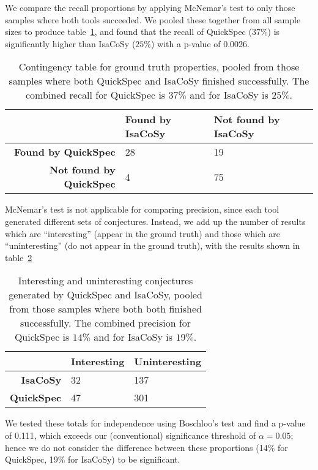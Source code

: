 We compare the recall proportions by applying McNemar's test to only those
samples where both tools succeeded. We pooled these together from all sample
sizes to produce table~\ref{table:recall}, and found that the recall of
QuickSpec ($37\%$) is significantly higher than IsaCoSy ($25\%$) with a p-value
of 0.0026.

\begin{table}
  \centering
  \begin{tabular}{ |r|l|l| }
    \hline
    & \bfseries Found by IsaCoSy & \bfseries Not found by IsaCoSy \\
    \hline
    \bfseries Found by QuickSpec     & 28 & 19 \\
    \hline
    \bfseries Not found by QuickSpec & 4  & 75 \\
    \hline
  \end{tabular}
  \caption{Contingency table for ground truth properties, pooled from those
    samples where both QuickSpec and IsaCoSy finished successfully. The combined
    recall for QuickSpec is $37\%$ and for IsaCoSy is $25\%$.}
  \label{table:recall}
\end{table}

McNemar's test is not applicable for comparing precision, since each tool
generated different sets of conjectures. Instead, we add up the number of
results which are ``interesting'' (appear in the ground truth) and those which
are ``uninteresting'' (do not appear in the ground truth), with the results
shown in table~\ref{table:precision}

\begin{table}
  \centering
  \begin{tabular}{ |r|l|l| }
    \hline
              & \bfseries Interesting & \bfseries Uninteresting \\
    \hline
    \bfseries IsaCoSy   & 32          & 137      \\
    \hline
    \bfseries QuickSpec & 47          & 301      \\
    \hline
  \end{tabular}
  \caption{Interesting and uninteresting conjectures generated by QuickSpec and
    IsaCoSy, pooled from those samples where both both finished successfully.
    The combined precision for QuickSpec is $14\%$ and for IsaCoSy is $19\%$.}
  \label{table:precision}
\end{table}

We tested these totals for independence using Boschloo's test and find a p-value
of 0.111, which exceeds our (conventional) significance threshold of
$\alpha = 0.05$; hence we do not consider the difference between these
proportions (14\% for QuickSpec, 19\% for IsaCoSy) to be significant.

